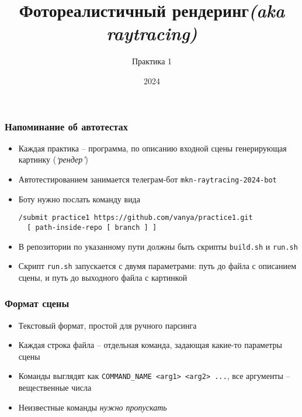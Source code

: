 \documentclass[10pt]{beamer}
\title{Фотореалистичный рендеринг\quad\quad\quad\quad\quad\quad \textit{(aka raytracing)}}
\subtitle{Практика 1}
\date{2024}
\begin{document}
\frame{\titlepage}

\begin{frame}[fragile]
\frametitle{Напоминание об автотестах}
\begin{itemize}
\item Каждая практика -- программа, по описанию входной сцены генерирующая картинку (\textit{`рендер'})
\pause
\item Автотестированием занимается телеграм-бот \texttt{mkn-raytracing-2024-bot}
\pause
\item Боту нужно послать команду вида
\begin{verbatim}
/submit practice1 https://github.com/vanya/practice1.git
  [ path-inside-repo [ branch ] ]
\end{verbatim}
\pause
\item В репозитории по указанному пути должны быть скрипты \texttt{build.sh} и \texttt{run.sh}
\pause
\item Скрипт \texttt{run.sh} запускается с двумя параметрами: путь до файла с описанием сцены, и путь до выходного файла с картинкой
\end{itemize}
\end{frame}

\begin{frame}
\frametitle{Формат сцены}
\begin{itemize}
\item Текстовый формат, простой для ручного парсинга
\pause
\item Каждая строка файла -- отдельная команда, задающая какие-то параметры сцены
\pause
\item Команды выглядят как \texttt{COMMAND\_NAME <arg1> <arg2> ...}, все аргументы -- вещественные числа
\pause
\item Неизвестные команды \textit{нужно пропускать}
\end{itemize}
\end{frame}
\end{document}

